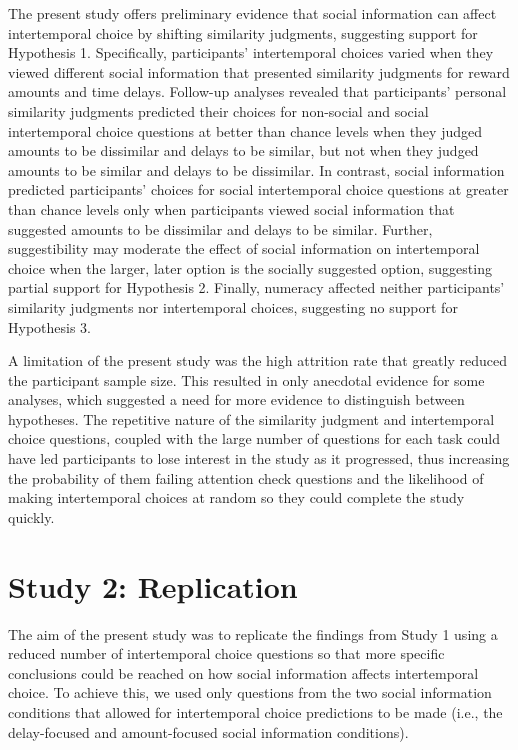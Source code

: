 \documentclass[
  pub,floatsintext]{apa6}
\begin{document}
The present study offers preliminary evidence that social information can affect intertemporal choice by shifting similarity judgments, suggesting support for Hypothesis 1. Specifically, participants' intertemporal choices varied when they viewed different social information that presented similarity judgments for reward amounts and time delays. Follow-up analyses revealed that participants' personal similarity judgments predicted their choices for non-social and social intertemporal choice questions at better than chance levels when they judged amounts to be dissimilar and delays to be similar, but not when they judged amounts to be similar and delays to be dissimilar. In contrast, social information predicted participants' choices for social intertemporal choice questions at greater than chance levels only when participants viewed social information that suggested amounts to be dissimilar and delays to be similar. Further, suggestibility may moderate the effect of social information on intertemporal choice when the larger, later option is the socially suggested option, suggesting partial support for Hypothesis 2. Finally, numeracy affected neither participants' similarity judgments nor intertemporal choices, suggesting no support for Hypothesis 3.

A limitation of the present study was the high attrition rate that greatly reduced the participant sample size. This resulted in only anecdotal evidence for some analyses, which suggested a need for more evidence to distinguish between hypotheses. The repetitive nature of the similarity judgment and intertemporal choice questions, coupled with the large number of questions for each task could have led participants to lose interest in the study as it progressed, thus increasing the probability of them failing attention check questions and the likelihood of making intertemporal choices at random so they could complete the study quickly.

\hypertarget{study-2-replication}{%
\section{Study 2: Replication}\label{study-2-replication}}

The aim of the present study was to replicate the findings from Study 1 using a reduced number of intertemporal choice questions so that more specific conclusions could be reached on how social information affects intertemporal choice. To achieve this, we used only questions from the two social information conditions that allowed for intertemporal choice predictions to be made (i.e., the delay-focused and amount-focused social information conditions).
\end{document}
